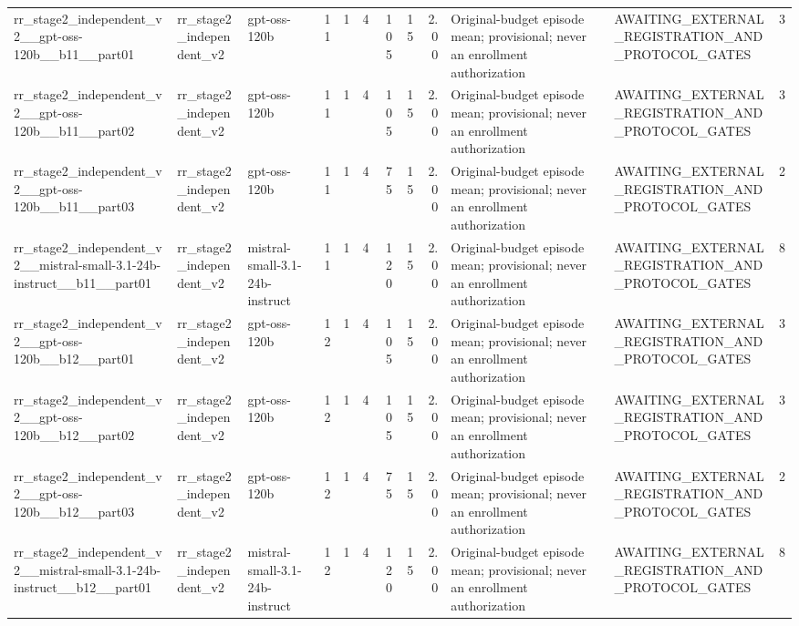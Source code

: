 \begin{tabular}{lllrrrrrrllr}
rr\_stage2\_independent\_v2\_\_gpt-oss-120b\_\_b11\_\_part01 & rr\_stage2\_independent\_v2 & gpt-oss-120b & 11 & 1 & 4 & 105 & 15 & 2.00 & Original-budget episode mean; provisional; never an enrollment authorization & AWAITING\_EXTERNAL\_REGISTRATION\_AND\_PROTOCOL\_GATES & 3 \\
rr\_stage2\_independent\_v2\_\_gpt-oss-120b\_\_b11\_\_part02 & rr\_stage2\_independent\_v2 & gpt-oss-120b & 11 & 1 & 4 & 105 & 15 & 2.00 & Original-budget episode mean; provisional; never an enrollment authorization & AWAITING\_EXTERNAL\_REGISTRATION\_AND\_PROTOCOL\_GATES & 3 \\
rr\_stage2\_independent\_v2\_\_gpt-oss-120b\_\_b11\_\_part03 & rr\_stage2\_independent\_v2 & gpt-oss-120b & 11 & 1 & 4 & 75 & 15 & 2.00 & Original-budget episode mean; provisional; never an enrollment authorization & AWAITING\_EXTERNAL\_REGISTRATION\_AND\_PROTOCOL\_GATES & 2 \\
rr\_stage2\_independent\_v2\_\_mistral-small-3.1-24b-instruct\_\_b11\_\_part01 & rr\_stage2\_independent\_v2 & mistral-small-3.1-24b-instruct & 11 & 1 & 4 & 120 & 15 & 2.00 & Original-budget episode mean; provisional; never an enrollment authorization & AWAITING\_EXTERNAL\_REGISTRATION\_AND\_PROTOCOL\_GATES & 8 \\
rr\_stage2\_independent\_v2\_\_gpt-oss-120b\_\_b12\_\_part01 & rr\_stage2\_independent\_v2 & gpt-oss-120b & 12 & 1 & 4 & 105 & 15 & 2.00 & Original-budget episode mean; provisional; never an enrollment authorization & AWAITING\_EXTERNAL\_REGISTRATION\_AND\_PROTOCOL\_GATES & 3 \\
rr\_stage2\_independent\_v2\_\_gpt-oss-120b\_\_b12\_\_part02 & rr\_stage2\_independent\_v2 & gpt-oss-120b & 12 & 1 & 4 & 105 & 15 & 2.00 & Original-budget episode mean; provisional; never an enrollment authorization & AWAITING\_EXTERNAL\_REGISTRATION\_AND\_PROTOCOL\_GATES & 3 \\
rr\_stage2\_independent\_v2\_\_gpt-oss-120b\_\_b12\_\_part03 & rr\_stage2\_independent\_v2 & gpt-oss-120b & 12 & 1 & 4 & 75 & 15 & 2.00 & Original-budget episode mean; provisional; never an enrollment authorization & AWAITING\_EXTERNAL\_REGISTRATION\_AND\_PROTOCOL\_GATES & 2 \\
rr\_stage2\_independent\_v2\_\_mistral-small-3.1-24b-instruct\_\_b12\_\_part01 & rr\_stage2\_independent\_v2 & mistral-small-3.1-24b-instruct & 12 & 1 & 4 & 120 & 15 & 2.00 & Original-budget episode mean; provisional; never an enrollment authorization & AWAITING\_EXTERNAL\_REGISTRATION\_AND\_PROTOCOL\_GATES & 8 \\

\end{tabular}
